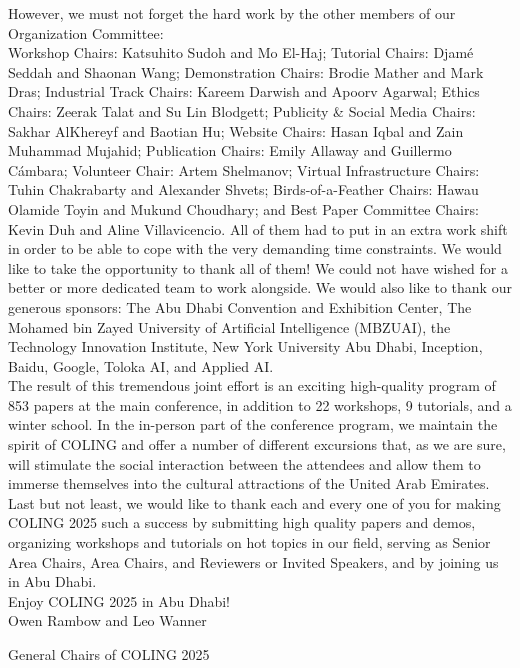 However, we must not forget the hard work by the other members of our Organization Committee: \\

Workshop Chairs: Katsuhito Sudoh and Mo El-Haj; Tutorial Chairs: Djamé Seddah and Shaonan Wang; Demonstration Chairs: Brodie Mather and Mark Dras; Industrial Track Chairs: Kareem Darwish and Apoorv Agarwal; Ethics Chairs: Zeerak Talat and Su Lin Blodgett; Publicity \& Social Media Chairs: Sakhar AlKhereyf and Baotian Hu; Website Chairs: Hasan Iqbal and Zain Muhammad Mujahid; Publication Chairs: Emily Allaway and Guillermo Cámbara; Volunteer Chair: Artem Shelmanov; Virtual Infrastructure Chairs: Tuhin Chakrabarty and Alexander Shvets; Birds-of-a-Feather Chairs: Hawau Olamide Toyin and Mukund Choudhary; and Best Paper Committee Chairs: Kevin Duh and Aline Villavicencio. All of them had to put in an extra work shift in order to be able to cope with the very demanding time constraints. We would like to take the opportunity to thank all of them! We could not have wished for a better or more dedicated team to work alongside. We would also like to thank our generous sponsors: The Abu Dhabi Convention and Exhibition Center, The Mohamed bin Zayed University of Artificial Intelligence (MBZUAI), the Technology Innovation Institute, New York University Abu Dhabi, Inception, Baidu, Google, Toloka AI, and Applied AI. \\

The result of this tremendous joint effort is an exciting high-quality program of 853 papers at the main conference, in addition to 22 workshops, 9 tutorials, and a winter school. In the in-person part of the conference program, we maintain the spirit of COLING and offer a number of different excursions that, as we are sure, will stimulate the social interaction between the attendees and allow them to immerse themselves into the cultural attractions of the United Arab Emirates.\\

Last but not least, we would like to thank each and every one of you for making COLING 2025 such a success by submitting high quality papers and demos, organizing workshops and tutorials on hot topics in our field, serving as Senior Area Chairs, Area Chairs, and Reviewers or Invited Speakers, and by joining us in Abu Dhabi.\\

Enjoy COLING 2025 in Abu Dhabi!\\

Owen Rambow and Leo Wanner

General Chairs of COLING 2025
